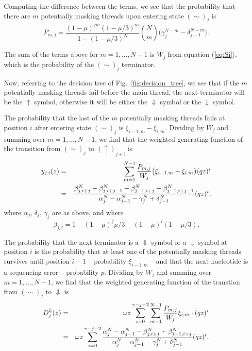 \documentclass{article}
\begin{document}
Computing the difference between the terms, we see that the probability
that there are $m$ potentially masking threads upon entering state
$(\sim)_j$ is
\begin{equation*}
P_{m,j} = \frac{(1-\mu)^{jm} (1-\mu/3)^m}{1-(1-\mu/3)^N} {N \choose m} 
\big( \gamma_j^{N-m} - \delta_{j-1}^{N-m} \big).
\end{equation*}


The sum of the terms above for $m = 1, \ldots, N-1$ is $W_j$ from equation
(\ref{eq:Si}), which is the probability of the $(\sim)_j$ terminator.

Now, referring to the decision tree of Fig.~\ref{fig:decision_tree}, we
see that if the $m$ potentially masking threads fail before the main
thread, the next terminator will be the $\uparrow$ symbol, otherwise it
will be either the $\Downarrow$ symbol or the $\downarrow$ symbol.

The probability that the last of the $m$ potentially masking threads fails
at position $i$ after entering state $(\sim)_j$ is
$\xi_{i-1,m}-\xi_{i,m}$. Dividing by $W_j$ and summing over $m = 1,
\ldots, N-1$, we find that the weighted generating function of the
transition from $(\sim)_j$ to $(\uparrow)_{j+i}$ is
\begin{eqnarray}
y_{j,i}(z) &=& \sum_{m=1}^{N-1} \frac{P_{m,j}}{W_j}
\big( \xi_{i-1,m}-\xi_{i,m} \big) (qz)^i \notag \\
&=& \frac{\beta_{j,i+j}^N - \beta_{j,i+j-1}^N
-\beta_{j-1,i+j}^N + \beta_{j-1,i+j-1}^N}
  {\alpha_j^N-\alpha_{j-1}^N-\gamma_j^N+\delta_{j-1}^N} (qz)^i,
\end{eqnarray}
where $\alpha_j$, $\delta_j$, $\gamma_j$ are as above, and where
\begin{equation}
\beta_{j,i} = 1 - (1-\mu)^j\mu/3 - (1-\mu)^i(1-\mu/3).
\end{equation}

The probability that the next terminator is a $\Downarrow$ symbol or a
$\downarrow$ symbol at position $i$ is the probability that at least one
of the potentially masking threads survives until position $i-1$ --
probability $\xi_{i-1,m}$ -- and that the next nucleotide is a sequencing
error -- probability $p$. Dividing by $W_j$ and summing over $m = 1,
\ldots, N-1$, we find that the weighted generating function of the
transtion from $(\sim)_j$ to
$\Downarrow$ is
\begin{eqnarray}
D^\Downarrow_j(z) &=& \omega z \sum_{i=0}^{\gamma-j-2} \sum_{m=1}^{N-1}
  \frac{P_{m,j}}{W_j} \xi_{i,m} \cdot (qz)^i \notag \\
  &=& \omega z \sum_{i=0}^{\gamma-j-2}
\frac{ \alpha_j^N-\alpha_{j-1}^N-\beta_{j,i+j}^N
  +\beta_{j-1,i+j}^N }
{\alpha_j^N-\alpha_{j-1}^N-\gamma_j^N+\delta_{j-1}^N} (qz)^i.
\end{eqnarray}
\end{document}
